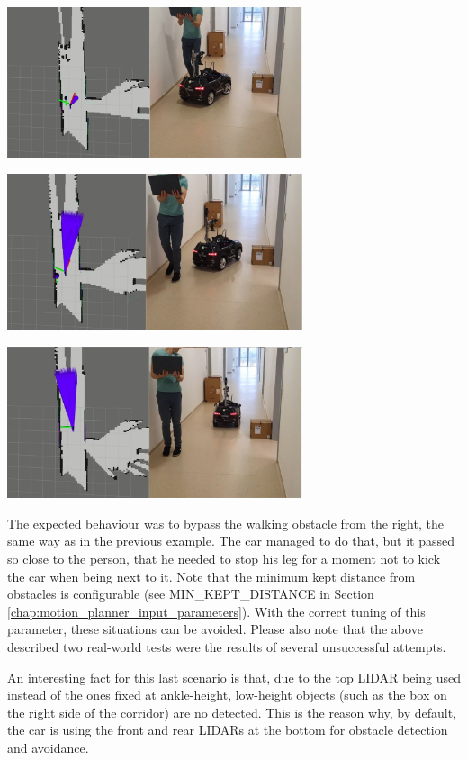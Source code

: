\begin{center}
    \vspace{0.5cm}
    \includegraphics[width=0.65\textwidth]{figures/raw/jpeg/local_planner_real_test_joined_straight_traj_1_dynamic_obj_4.jpg}
    
    \vspace{0.5cm}
    \includegraphics[width=0.65\textwidth]{figures/raw/jpeg/local_planner_real_test_joined_straight_traj_1_dynamic_obj_5.jpg}
    
    \vspace{0.5cm}
    \includegraphics[width=0.65\textwidth]{figures/raw/jpeg/local_planner_real_test_joined_straight_traj_1_dynamic_obj_6.jpg}
    
    \label{local_planner_real_test_joined_straight_traj_1_dynamic_obj}
\end{center}

The expected behaviour was to bypass the walking obstacle from the right, the same way as in the previous example. The car managed to do that, but it passed so close to the person, that he needed to stop his leg for a moment not to kick the car when being next to it. Note that the minimum kept distance from obstacles is configurable (see MIN\_KEPT\_DISTANCE in Section \ref{chap:motion_planner_input_parameters}). With the correct tuning of this parameter, these situations can be avoided. Please also note that the above described two real-world tests were the results of several unsuccessful attempts.

An interesting fact for this last scenario is that, due to the top LIDAR being used instead of the ones fixed at ankle-height, low-height objects (such as the box on the right side of the corridor) are no detected. This is the reason why, by default, the car is using the front and rear LIDARs at the bottom for obstacle detection and avoidance.